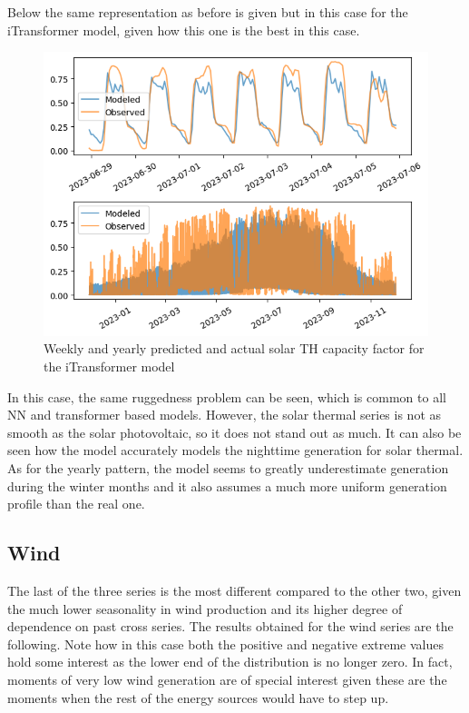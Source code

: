Below the same representation as before is given but in this case for the iTransformer model, given how this one is the best in this case.
\begin{figure}[ht]
    \centering
    \captionsetup{justification=centering}
    \includegraphics[width=0.7\linewidth]{assets/itransformer-solar-th.png}
    \caption{Weekly and yearly predicted and actual solar TH capacity factor for the iTransformer model}
    \label{fig:itransformer-solar-th}
\end{figure}
In this case, the same ruggedness problem can be seen, which is common to all NN and transformer based models. However, the solar thermal series is not as smooth as the solar photovoltaic, so it does not stand out as much. It can also be seen how the model accurately models the nighttime generation for solar thermal. 
As for the yearly pattern, the model seems to greatly underestimate generation during the winter months and it also assumes a much more uniform generation profile than the real one. 
\subsection{Wind}
The last of the three series is the most different compared to the other two, given the much lower seasonality in wind production and its higher degree of dependence on past cross series. The results obtained for the wind series are the following. Note how in this case both the positive and negative extreme values hold some interest as the lower end of the distribution is no longer zero. In fact, moments of very low wind generation are of special interest given these are the moments when the rest of the energy sources would have to step up.  

